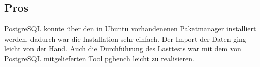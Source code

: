 \subsection{Pros}
PostgreSQL konnte über den in Ubuntu vorhandenenen Paketmanager installiert werden, dadurch war die Installation sehr einfach. Der Import der Daten ging leicht von der Hand. Auch die Durchführung des Lasttests war mit dem von PostgreSQL mitgelieferten Tool pgbench leicht zu realisieren.  

